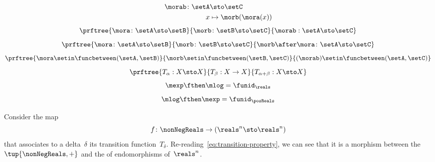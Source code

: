 {\begin{forslides}
        \begin{equation}
            \label{eq:funcomposition}
            \begin{aligned}
                \morab \colon \setA & \sto  \setC \\
                x                   & \mapsto \morb(\mora(x))
            \end{aligned}
        \end{equation}
        \begin{equation}
            \label{eq:funccomp1}
            \prftree{\mora \colon \setA \sto \setB}{\morb \colon \setB \sto \setC}{\morab : \setA \sto \setC}
        \end{equation}
        \begin{equation}
            \label{eq:funccomp2}
            \prftree{\mora \colon \setA \sto \setB}{\morb \colon \setB \sto \setC}{\morb \after \mora \colon \setA \sto \setC}
        \end{equation}
        \begin{equation}
            \label{eq:funccomp3}
            \prftree{%
                \mora \setin \funcbetween(\setA, \setB)}{%
                \morb \setin \funcbetween( \setB, \setC)}{
                (\morab) \setin \funcbetween( \setA, \setC)}
        \end{equation}
        \begin{equation}
            \label{eq:transitions}
            \prftree{T_\alpha: X \sto X }{T_\beta : X \to X}{T_{\alpha+\beta} : X \sto X}
        \end{equation}
        \begin{equation}
            \label{eq:explogid}
            \mexp \fthen \mlog = \funid_{\reals}
        \end{equation}
        \begin{equation}
            \label{eq:logexpid}
            \mlog \fthen \mexp = \funid_{\posReals}
        \end{equation}
    \end{forslides}
}%

\begin{example}
    Consider the map
    \begin{equation}
        f\colon \nonNegReals \to (\reals^n \sto \reals^n)
    \end{equation}
    that associates to a delta~$\delta$ its transition function~$T_\delta$.
    Re-reading~\cref{eq:transition-property}, we can see that it is a morphism between the ~$\tup{\nonNegReals,+}$ and the  of endomorphisms of~$\reals^n$.
\end{example}

